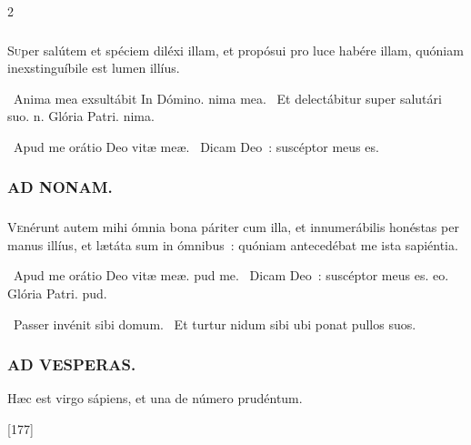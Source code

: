 \documentclass[9pt,twoside]{extarticle}
\begin{document}
\begin{multicols}{2}
{\subsubsection*{}
\lettrine{S}uper salútem et spéciem diléxi illam, et propósui pro luce habére illam, quóniam inexstinguíbile est lumen illíus.

\begin{tightlist}{}
\item {}~Anima mea exsultábit \textred{*} In Dómino. nima mea. ~Et delectábitur super salutári suo. n. Glória Patri. nima.
\item {}~Apud me orátio Deo vitæ meæ. ~Dicam Deo~: suscéptor meus es.
\end{tightlist}

\subsubsection*{\center \textsc{AD NONAM.}}
\subsubsection*{}
\lettrine{V}enérunt autem mihi ómnia bona páriter cum illa, et innumerábilis honéstas per manus illíus, et lætáta sum in ómnibus~: quóniam antecedébat me ista sapiéntia.

\begin{tightlist}{}
\item {}~Apud me orátio \textred{*} Deo vitæ meæ. pud me. ~Dicam Deo~: suscéptor meus es. eo. Glória Patri. pud.
\item {}~Passer invénit sibi domum. ~Et turtur nidum sibi ubi ponat pullos suos.
\end{tightlist}

\subsubsection*{\center \textsc{AD VESPERAS.}}
\begin{tightlist}{}
\item {} Hæc est virgo sápiens, et una de número prudéntum. 
\item {} [177]
\end{tightlist}

}
\end{multicols}
\end{document}
